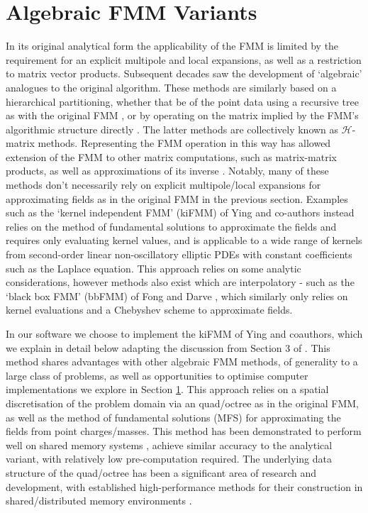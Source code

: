 \section{Algebraic FMM Variants}\label{chpt:2:sec:1}

In its original analytical form the applicability of the FMM is limited by the requirement for an explicit multipole and local expansions, as well as a restriction to matrix vector products. Subsequent decades saw the development of `algebraic' analogues to the original algorithm. These methods are similarly based on a hierarchical partitioning, whether that be of the point data using a recursive tree as with the original FMM \cite{Ying:2004:JCP,fong2009black}, or by operating on the matrix implied by the FMM's algorithmic structure directly \cite{hackbusch1999sparse,borm2003introduction,chandrasekaran2007fast}. The latter methods are collectively known as $\mathcal{H}$-matrix methods. Representing the FMM operation in this way has allowed extension of the FMM to other matrix computations, such as matrix-matrix products, as well as approximations of its inverse \cite{ambikasaran2014inverse}. Notably, many of these methods don't necessarily rely on explicit multipole/local expansions for approximating fields as in the original FMM in the previous section. Examples such as the `kernel independent FMM' (kiFMM) of Ying and co-authors instead relies on the method of fundamental solutions to approximate the fields and requires only evaluating kernel values, and is applicable to a wide range of kernels from second-order linear non-oscillatory elliptic PDEs with constant coefficients such as the Laplace equation. This approach relies on some analytic considerations, however methods also exist which are interpolatory - such as the `black box FMM' (bbFMM) of Fong and Darve \cite{fong2009black}, which similarly only relies on kernel evaluations and a Chebyshev scheme to approximate fields.

In our software we choose to implement the kiFMM of Ying and coauthors, which we explain in detail below adapting the discussion from Section 3 of \cite{Ying:2004:JCP}. This method shares advantages with other algebraic FMM methods, of generality to a large class of problems, as well as opportunities to optimise computer implementations we explore in Section \ref{chpt:2:sec:1}. This approach relies on a spatial discretisation of the problem domain via an quad/octree as in the original FMM, as well as the method of fundamental solutions (MFS) for approximating the fields from point charges/masses. This method has been demonstrated to perform well on shared memory systems \cite{wang2021exafmm}, achieve similar accuracy to the analytical variant, with relatively low pre-computation required. The underlying data structure of the quad/octree has been a significant area of research and development, with established high-performance methods for their construction in shared/distributed memory environments \cite{sundar2008bottom,sundar2013hyksort,BursteddeWilcoxGhattas11}.

